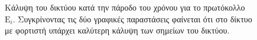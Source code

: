\begin{figure}[H]
  \centering
  \caption{Κάλυψη του δικτύου κατά την πάροδο του χρόνου για το πρωτόκολλο $\text{E}_{i}$. Συγκρίνοντας τις δύο γραφικές παραστάσεις φαίνεται ότι στο δίκτυο με
φορτιστή
υπάρχει καλύτερη κάλυψη των σημείων του δικτύου.}
  \label{fig:5_1exp_3_3}
\end{figure}





